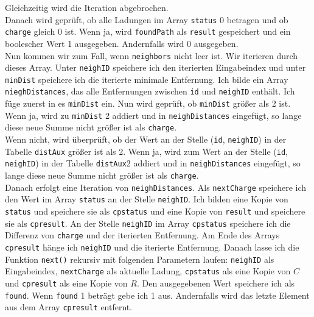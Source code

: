 \documentclass[a4paper,10pt,ngerman]{scrartcl}
\begin{document}
Gleichzeitig wird die Iteration abgebrochen.\\
Danach wird geprüft, ob alle Ladungen im Array \texttt{status} 0 betragen und ob \texttt{charge} gleich 0 ist.
Wenn ja, wird \texttt{foundPath} als \texttt{result} gespeichert und ein boolescher Wert 1 ausgegeben. Andernfalls wird 0 ausgegeben.\\
Nun kommen wir zum Fall, wenn \texttt{neighbors} nicht leer ist. Wir iterieren durch dieses Array.
Unter \texttt{neighID} speichere ich den iterierten Eingabeindex und unter \texttt{minDist} speichere ich die iterierte minimale Entfernung.
Ich bilde ein Array \texttt{nieghDistances}, das alle Entfernungen zwischen \texttt{id} und \texttt{neighID} enthält.
Ich füge zuerst in es \texttt{minDist} ein. Nun wird geprüft, ob \texttt{minDist} größer als 2 ist.
Wenn ja, wird zu \texttt{minDist} 2 addiert und in \texttt{neighDistances} eingefügt,
so lange diese neue Summe nicht größer ist als \texttt{charge}.\\
Wenn nicht, wird überprüft, ob der Wert an der Stelle (\texttt{id}, \texttt{neighID}) in der Tabelle \texttt{distAux} größer ist
als 2. Wenn ja, wird zum Wert an der Stelle (\texttt{id}, \texttt{neighID}) in der Tabelle \texttt{distAux}2 addiert
und in \texttt{neighDistances} eingefügt, so lange diese neue Summe nicht größer ist als \texttt{charge}.\\
Danach erfolgt eine Iteration von \texttt{neighDistances}. Als \texttt{nextCharge} speichere ich den Wert im Array \texttt{status}
an der Stelle \texttt{neighID}. Ich bilden eine Kopie von \texttt{status} und speichere sie als \texttt{cpstatus} und
eine Kopie von \texttt{result} und speichere sie als \texttt{cpresult}. An der Stelle \texttt{neighID} im Array \texttt{cpstatus}
speichere ich die Differenz von \texttt{charge} und der iterierten Entfernung. Am Ende des Arrays \texttt{cpresult} hänge ich
\texttt{neighID} und die iterierte Entfernung.
Danach lasse ich die Funktion \texttt{next()} rekursiv mit folgenden Parametern laufen: \texttt{neighID} als Eingabeindex,
\texttt{nextCharge} als aktuelle Ladung, \texttt{cpstatus} als eine Kopie von $C$ und \texttt{cpresult} als eine Kopie von $R$.
Den ausgegebenen Wert speichere ich als \texttt{found}. Wenn \texttt{found} 1 beträgt gebe ich 1 aus.
Andernfalls wird das letzte Element aus dem Array \texttt{cpresult} entfernt.\\
\end{document}
